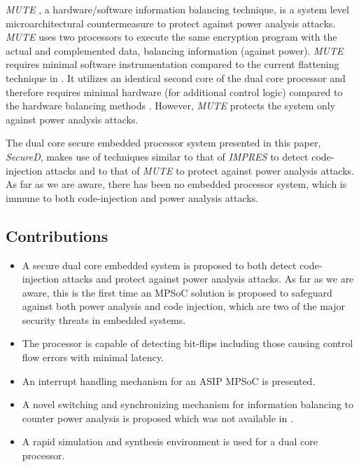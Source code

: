 \documentclass{article}
\newcommand{\SecureD}{\emph{SecureD}}
\begin{document}
\emph{MUTE} \cite{ambrose2011multiprocessor}, a  hardware/software information
balancing technique,  is  a    system    level     microarchitectural
countermeasure to protect against power analysis attacks. \emph{MUTE}
uses two processors to execute the same encryption program with   the
actual and complemented data, balancing  information (against power).
\emph{MUTE} requires minimal software instrumentation  compared    to 
the current flattening technique in  \cite{muresan04currentflat}.  It
utilizes  an   identical   second core of the dual core processor and
therefore  requires   minimal hardware (for additional control logic)
compared to the hardware balancing methods \cite{sokolov05DualRail,
hwang06coprocdesign,Hwang06Secure,   popp05balancing, saputra03masking, 
tiri04ASIC,tiri2006WDDL}. However, \emph{MUTE} protects    the system
only against power analysis attacks.

The  dual  core  secure  embedded  processor system presented in this
paper, \SecureD,  makes    use of      techniques  similar  to that of
\emph{IMPRES} \cite{ragel06impres} to   detect code-injection attacks
and to that of \emph{MUTE} \cite{ambrose2011multiprocessor} to protect against
power  analysis attacks. As far as we are aware, there has been no embedded 
processor system, which is immune to  both   code-injection and power
analysis attacks. 

\subsection{Contributions}
\begin{itemize} 
\item A secure dual core embedded system  is proposed to both  detect
      code-injection  attacks   and   protect  against power analysis
      attacks. As far as we are aware, this is the first time an MPSoC solution is proposed to 
      safeguard against both power analysis and code injection, which are two of the major
      security threats in embedded systems. 
\item The processor is capable of detecting bit-flips including those
      causing control flow errors with minimal latency.
\item An interrupt handling mechanism for an ASIP MPSoC is presented. \item A  novel switching and synchronizing  mechanism for information
      balancing to counter power analysis is proposed which was not available in \cite{ambrose2011multiprocessor}.               \item A rapid simulation and synthesis environment is used for a dual core processor. \end{itemize}
\end{document}
